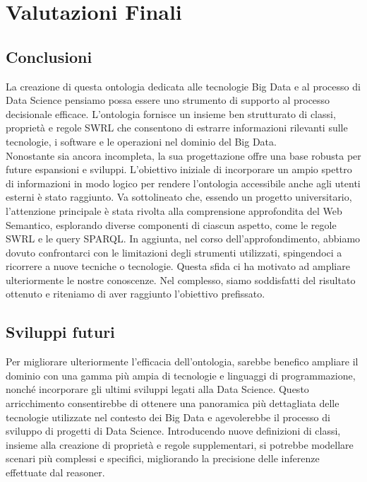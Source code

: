 \chapter{Valutazioni Finali}

\section{Conclusioni}
La creazione di questa ontologia dedicata alle tecnologie Big Data e al processo di Data Science pensiamo possa essere uno strumento di supporto al processo decisionale efficace. L'ontologia fornisce un insieme ben strutturato di classi, proprietà e regole SWRL che consentono di estrarre informazioni rilevanti sulle tecnologie, i software e le operazioni nel dominio del Big Data.\\

Nonostante sia ancora incompleta, la sua progettazione offre una base robusta per future espansioni e sviluppi. L'obiettivo iniziale di incorporare un ampio spettro di informazioni in modo logico per rendere l'ontologia accessibile anche agli utenti esterni è stato raggiunto. Va sottolineato che, essendo un progetto universitario, l'attenzione principale è stata rivolta alla comprensione approfondita del Web Semantico, esplorando diverse componenti di ciascun aspetto, come le regole SWRL e le query SPARQL. In aggiunta, nel corso dell'approfondimento, abbiamo dovuto confrontarci con le limitazioni degli strumenti utilizzati, spingendoci a ricorrere a nuove tecniche o tecnologie. Questa sfida ci ha motivato ad ampliare ulteriormente le nostre conoscenze. Nel complesso, siamo soddisfatti del risultato ottenuto e riteniamo di aver raggiunto l'obiettivo prefissato.

\section{Sviluppi futuri}
Per migliorare ulteriormente l'efficacia dell'ontologia, sarebbe benefico ampliare il dominio con una gamma più ampia di tecnologie e linguaggi di programmazione, nonché incorporare gli ultimi sviluppi legati alla Data Science. Questo arricchimento consentirebbe di ottenere una panoramica più dettagliata delle tecnologie utilizzate nel contesto dei Big Data e agevolerebbe il processo di sviluppo di progetti di Data Science. Introducendo nuove definizioni di classi, insieme alla creazione di proprietà e regole supplementari, si potrebbe modellare scenari più complessi e specifici, migliorando la precisione delle inferenze effettuate dal reasoner.